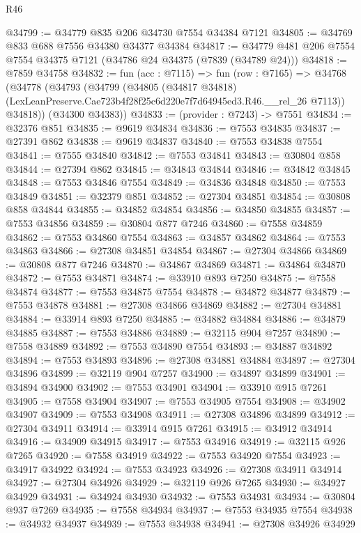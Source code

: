 \begin{lexlean}{R46}
\begin{coremodule}
@34799 := @34779 @835 @206 @34730 @7554 @34384 @7121
@34805 := @34769 @833 @688 @7556 @34380 @34377 @34384
@34817 := @34779 @481 @206 @7554 @7554 @34375 @7121 (@34786 @24 @34375 (@7839 (@34789 @24)))
@34818 := @7859 @34758
@34832 := fun (acc : @7115) =>
  fun (row : @7165) =>
  @34768
    (@34778
      (@34793
        (@34799
          (@34805
            (@34817 @34818)
            (LexLeanPreserve.Cae723b4f28f25c6d220e7f7d64945ed3.R46.__rel_26 @7113))
          @34818))
      (@34300 @34383))
@34833 := (provider : @7243) -> @7551
@34834 := @32376 @851
@34835 := @9619 @34834
@34836 := @7553 @34835
@34837 := @27391 @862
@34838 := @9619 @34837
@34840 := @7553 @34838 @7554
@34841 := @7555 @34840
@34842 := @7553 @34841
@34843 := @30804 @858
@34844 := @27394 @862
@34845 := @34843 @34844
@34846 := @34842 @34845
@34848 := @7553 @34846 @7554
@34849 := @34836 @34848
@34850 := @7553 @34849
@34851 := @32379 @851
@34852 := @27304 @34851
@34854 := @30808 @858 @34844
@34855 := @34852 @34854
@34856 := @34850 @34855
@34857 := @7553 @34856
@34859 := @30804 @877 @7246
@34860 := @7558 @34859
@34862 := @7553 @34860 @7554
@34863 := @34857 @34862
@34864 := @7553 @34863
@34866 := @27308 @34851 @34854
@34867 := @27304 @34866
@34869 := @30808 @877 @7246
@34870 := @34867 @34869
@34871 := @34864 @34870
@34872 := @7553 @34871
@34874 := @33910 @893 @7250
@34875 := @7558 @34874
@34877 := @7553 @34875 @7554
@34878 := @34872 @34877
@34879 := @7553 @34878
@34881 := @27308 @34866 @34869
@34882 := @27304 @34881
@34884 := @33914 @893 @7250
@34885 := @34882 @34884
@34886 := @34879 @34885
@34887 := @7553 @34886
@34889 := @32115 @904 @7257
@34890 := @7558 @34889
@34892 := @7553 @34890 @7554
@34893 := @34887 @34892
@34894 := @7553 @34893
@34896 := @27308 @34881 @34884
@34897 := @27304 @34896
@34899 := @32119 @904 @7257
@34900 := @34897 @34899
@34901 := @34894 @34900
@34902 := @7553 @34901
@34904 := @33910 @915 @7261
@34905 := @7558 @34904
@34907 := @7553 @34905 @7554
@34908 := @34902 @34907
@34909 := @7553 @34908
@34911 := @27308 @34896 @34899
@34912 := @27304 @34911
@34914 := @33914 @915 @7261
@34915 := @34912 @34914
@34916 := @34909 @34915
@34917 := @7553 @34916
@34919 := @32115 @926 @7265
@34920 := @7558 @34919
@34922 := @7553 @34920 @7554
@34923 := @34917 @34922
@34924 := @7553 @34923
@34926 := @27308 @34911 @34914
@34927 := @27304 @34926
@34929 := @32119 @926 @7265
@34930 := @34927 @34929
@34931 := @34924 @34930
@34932 := @7553 @34931
@34934 := @30804 @937 @7269
@34935 := @7558 @34934
@34937 := @7553 @34935 @7554
@34938 := @34932 @34937
@34939 := @7553 @34938
@34941 := @27308 @34926 @34929

\end{coremodule}
\end{lexlean}
